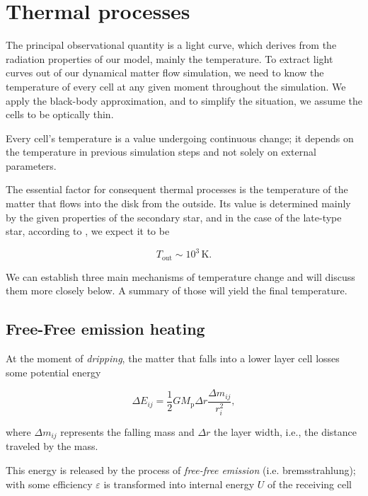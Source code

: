 
\section{Thermal processes}
\label{sec:thermal_processes}

The principal observational quantity is a light curve, which derives from the radiation properties of our model, mainly the temperature. To extract light curves out of our dynamical matter flow simulation, we need to know the temperature of every cell at any given moment throughout the simulation. We apply the black-body approximation, and to simplify the situation, we assume the cells to be optically thin. 

Every cell's temperature is a value undergoing continuous change; it depends on the temperature in previous simulation steps and not solely on external parameters.

The essential factor for consequent thermal processes is the temperature of the matter that flows into the disk from the outside. Its value is determined mainly by the given properties of the secondary star, and in the case of the late-type star, according to \cite{allen1973}, we expect it to be

\begin{equation}
T_{\text{out}} \sim 10^3\, \mathrm{K}.
\end{equation}

We can establish three main mechanisms of temperature change and will discuss them more closely below. A summary of those will yield the final temperature. 

\subsection{Free-Free emission heating}

At the moment of \emph{dripping}, the matter that falls into a lower layer cell losses some potential energy \cite{yonehara1997} 

\begin{equation}
   \Delta E_{ij} = \frac{1}{2} G M_{\text{p}} \Delta r \frac{\Delta m_{ij}}{r_i^2},
   \label{eq:e_pot}
\end{equation}

where $\Delta m_{ij}$ represents the falling mass and $\Delta r$ the layer width, i.e., the distance traveled by the mass. 

This energy is released by the process of \emph{free-free emission} (i.e. bremsstrahlung); with some efficiency $\varepsilon$ is transformed into internal energy $U$ of the receiving cell

